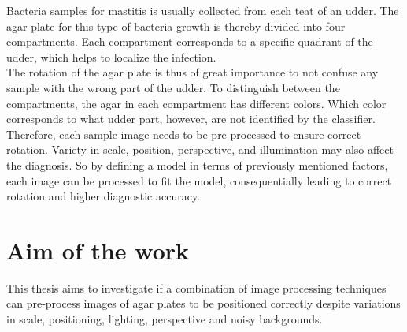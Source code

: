 \noindent Bacteria samples for mastitis is usually collected from each teat of an udder. The agar plate for this type of bacteria growth is thereby divided into four compartments. Each compartment corresponds to a specific quadrant of the udder, which helps to localize the infection. \\

\noindent The rotation of the agar plate is thus of great importance to not confuse any sample with the wrong part of the udder. To distinguish between the compartments, the agar in each compartment has different colors. Which color corresponds to what udder part, however, are not identified by the classifier.\\

\noindent Therefore, each sample image needs to be pre-processed to ensure correct rotation. Variety in scale, position, perspective, and illumination may also affect the diagnosis. So by defining a model in terms of previously mentioned factors, each image can be processed to fit the model, consequentially leading to correct rotation and higher diagnostic accuracy.




\section{Aim of the work}
This thesis aims to investigate if a combination of image processing techniques can pre-process images of agar plates to be positioned correctly despite variations in scale, positioning, lighting, perspective and noisy backgrounds. 

